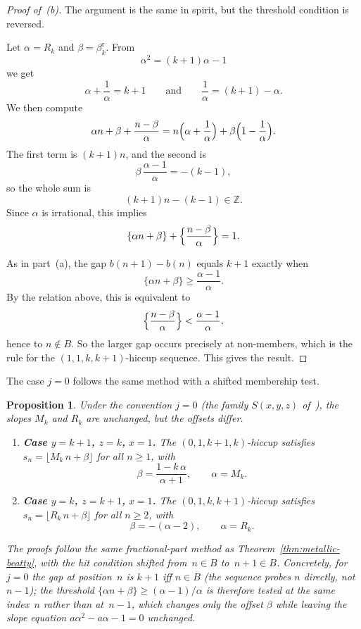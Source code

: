\documentclass[11pt]{article}
\numberwithin{equation}{section}
\theoremstyle{plain}
\newtheorem{proposition}[theorem]{Proposition}
\theoremstyle{definition}
\theoremstyle{remark}
\newcommand{\Z}{\mathbb{Z}}
\begin{document}
\begin{proof}[Proof of~\textup{(b)}]
The argument is the same in spirit, but the threshold condition is reversed.

Let $\alpha=R_k$ and $\beta=\beta_k^{\mathrm{r}}$.  From
\[
\alpha^2=(k+1)\alpha-1
\]
we get
\[
\alpha+\frac1\alpha=k+1
\qquad\text{and}\qquad
\frac1\alpha=(k+1)-\alpha.
\]
We then compute
\[
\alpha n+\beta+\frac{n-\beta}{\alpha}
=
n\Bigl(\alpha+\frac1\alpha\Bigr)
+\beta\Bigl(1-\frac1\alpha\Bigr).
\]
The first term is $(k+1)n$, and the second is
\[
\beta\,\frac{\alpha-1}{\alpha}=-(k-1),
\]
so the whole sum is
\[
(k+1)n-(k-1)\in\Z.
\]
Since $\alpha$ is irrational, this implies
\[
\{\alpha n+\beta\}
+
\Bigl\{\frac{n-\beta}{\alpha}\Bigr\}
=1.
\]

As in part~\textup{(a)}, the gap $b(n+1)-b(n)$ equals $k+1$ exactly when
\[
\{\alpha n+\beta\}\ge \frac{\alpha-1}{\alpha}.
\]
By the relation above, this is equivalent to
\[
\Bigl\{\frac{n-\beta}{\alpha}\Bigr\}<\frac{\alpha-1}{\alpha},
\]
hence to $n\notin B$.
So the larger gap occurs precisely at non-members, which is the rule
for the $(1,1,k,k{+}1)$-hiccup sequence.  This gives the result.
\end{proof}

The case $j=0$ follows the same method with a shifted membership test.

\begin{proposition}\label{prop:offset-j0}
Under the convention $j=0$ (the family $S(x,y,z)$
of~\textup{\cite{Cloitre2025}}),
the slopes $M_k$ and $R_k$ are unchanged, but the offsets differ.
\begin{enumerate}
\item[\textup{(a)}] \textbf{Case $y=k+1$, $z=k$,} $x=1$\textbf{.}
The $(0,1,k{+}1,k)$-hiccup satisfies
$s_n=\lfloor M_k\,n+\beta\rfloor$ for all $n\ge1$, with
\begin{equation}\label{eq:beta-j0-a}
  \beta=\frac{1-k\,\alpha}{\alpha+1},
  \qquad \alpha=M_k.
\end{equation}
\item[\textup{(b)}] \textbf{Case $y=k$, $z=k+1$,} $x=1$\textbf{.}
The $(0,1,k,k{+}1)$-hiccup satisfies
$s_n=\lfloor R_k\,n+\beta\rfloor$ for all $n\ge2$, with
\begin{equation}\label{eq:beta-j0-b}
  \beta=-(\alpha-2),
  \qquad \alpha=R_k.
\end{equation}
\end{enumerate}
The proofs follow the same fractional-part method as
Theorem~\textup{\ref{thm:metallic-beatty}}, with the hit
condition shifted from~$n\in B$ to~$n{+}1\in B$.
Concretely, for $j=0$ the gap at position~$n$ is $k+1$ iff $n\in B$
(the sequence probes $n$ directly, not $n-1$); the threshold
$\{\alpha n+\beta\}\ge(\alpha-1)/\alpha$ is therefore tested at the
same index~$n$ rather than at~$n-1$, which changes only the offset
$\beta$ while leaving the slope equation $a\alpha^2-a\alpha-1=0$
unchanged.
\end{proposition}
\end{document}
